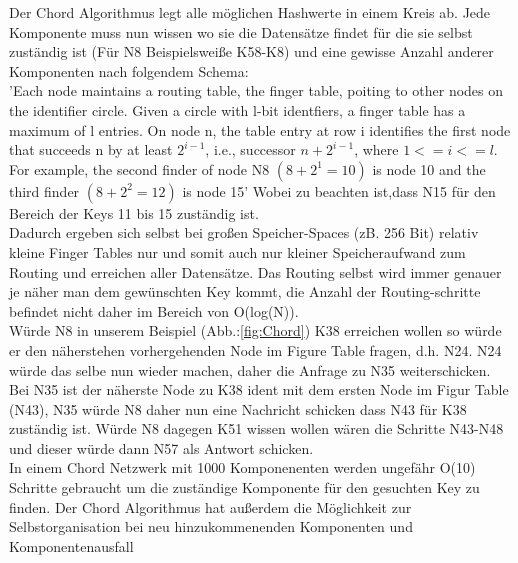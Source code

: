 \documentclass[a4paper,12pt]{scrreprt}
\begin{document}
					Der Chord Algorithmus legt alle möglichen Hashwerte in einem Kreis ab. Jede Komponente muss nun wissen wo sie die Datensätze findet für die sie selbst zuständig ist (Für N8 Beispielsweiße K58-K8) und eine gewisse Anzahl anderer Komponenten nach folgendem Schema:\\
					'Each node maintains a routing table, the finger table, poiting to other nodes on the identifier circle. Given a circle with l-bit identfiers, a finger table has a maximum of l entries. On node n, the table entry at row i identifies the first node that succeeds n by at least $2^{i-1}$, i.e., successor $n+{2}^{i-1}$, where $1 <= i <= l$. For example, the second finder of node N8 $(8+2^1=10)$ is node 10 and the third finder $(8+2^2=12)$ is node 15' Wobei zu beachten ist,dass N15 für den Bereich der Keys 11 bis 15 zuständig ist. %
					\\Dadurch ergeben sich selbst bei großen Speicher-Spaces (zB. 256 Bit) relativ kleine Finger Tables nur und somit auch nur kleiner Speicheraufwand zum Routing und erreichen aller Datensätze. Das Routing selbst wird immer genauer je näher man dem gewünschten Key kommt, die Anzahl der Routing-schritte befindet nicht daher im Bereich von O(log(N)). \\
					Würde N8 in unserem Beispiel (Abb.:\ref{fig:Chord}) K38 erreichen wollen so würde er den näherstehen vorhergehenden Node im Figure Table fragen, d.h. N24. N24 würde das selbe nun wieder machen, daher die Anfrage zu N35 weiterschicken. Bei N35 ist der näherste Node zu K38 ident mit dem ersten Node im Figur Table (N43), N35 würde N8 daher nun eine Nachricht schicken dass N43 für K38 zuständig ist. Würde N8 dagegen K51 wissen wollen wären die Schritte N43-N48 und dieser würde dann N57 als Antwort schicken.\\
					In einem Chord Netzwerk mit 1000 Komponenenten werden ungefähr O(10) Schritte gebraucht um die zuständige Komponente für den gesuchten Key zu finden. Der Chord Algorithmus hat außerdem die Möglichkeit zur Selbstorganisation bei neu hinzukommenenden Komponenten und Komponentenausfall
					
					
\end{document}
